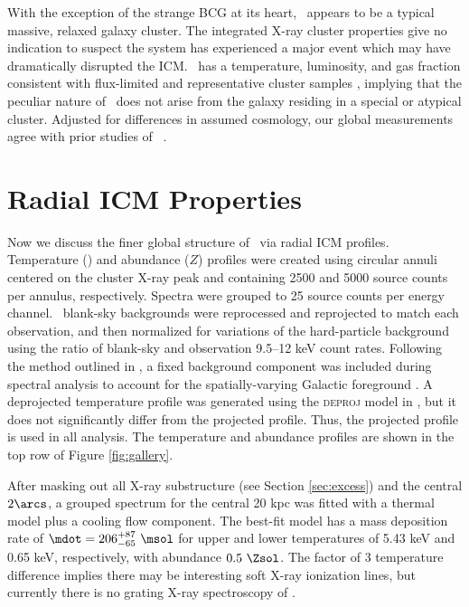 \documentclass[useAMS,usenatbib]{mn2e}
\begin{document}
With the exception of the strange BCG at its heart, \rxj\ appears to
be a typical massive, relaxed galaxy cluster. The integrated X-ray
cluster properties give no indication to suspect the system has
experienced a major event which may have dramatically disrupted the
ICM. \rxj\ has a temperature, luminosity, and gas fraction consistent
with flux-limited and representative cluster samples \citep{hiflugcs2,
  2009A&A...498..361P}, implying that the peculiar nature of
\irs\ does not arise from the galaxy residing in a special or atypical
cluster. Adjusted for differences in assumed cosmology, our global
measurements agree with prior studies of
\irs\ \citep[\eg][]{2000MNRAS.315..269A}.

\section{Radial ICM Properties}
\label{sec:rad}

Now we discuss the finer global structure of \rxj\ via radial ICM
profiles. Temperature (\tx) and abundance ($Z$) profiles were created
using circular annuli centered on the cluster X-ray peak and
containing 2500 and 5000 source counts per annulus,
respectively. Spectra were grouped to 25 source counts per energy
channel. \caldb\ blank-sky backgrounds were reprocessed and
reprojected to match each observation, and then normalized for
variations of the hard-particle background using the ratio of
blank-sky and observation 9.5--12 keV count rates. Following the
method outlined in \citet{2005ApJ...628..655V}, a fixed background
component was included during spectral analysis to account for the
spatially-varying Galactic foreground \citep[see][for more
  detail]{xrayband}. A deprojected temperature profile was generated
using the \textsc{deproj} model in \xspec, but it does not
significantly differ from the projected profile. Thus, the projected
profile is used in all analysis. The temperature and abundance
profiles are shown in the top row of Figure \ref{fig:gallery}.

After masking out all X-ray substructure (see Section
\ref{sec:excess}) and the central $2\arcs$, a grouped spectrum for the
central 20 kpc was fitted with a thermal model plus a cooling flow
component. The best-fit model has a mass deposition rate of $\mdot =
206^{+87}_{-65} ~\msol$ for upper and lower temperatures of 5.43 keV
and 0.65 keV, respectively, with abundance $0.5 ~\Zsol$. The factor of
3 temperature difference implies there may be interesting soft X-ray
ionization lines, but currently there is no grating X-ray spectroscopy
of \irs.
\end{document}

